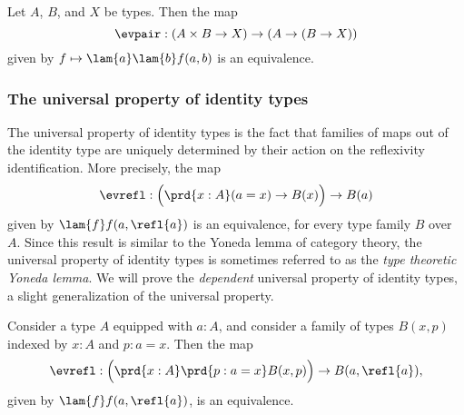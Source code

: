 \begin{cor}\label{cor:times_up_out}
Let $A$, $B$, and $X$ be types. Then the map
\begin{equation*}
\evpair: (A\times B \to X)\to (A\to (B\to X))
\end{equation*}
given by $f\mapsto\lam{a}\lam{b}f(a,b)$ is an equivalence.
\end{cor}

\subsubsection*{The universal property of identity types}
The universal property of identity types is the fact that families of maps out of the identity type are uniquely determined by their action on the reflexivity identification. More precisely, the map
\begin{equation*}
  \evrefl:\Big(\prd{x:A}(a=x)\to B(x)\Big)\to B(a)
\end{equation*}
given by $\lam{f} f(a,\refl{a})$ is an equivalence, for every type family $B$ over $A$. Since this result is similar to the Yoneda lemma of category theory, the universal property of identity types is sometimes referred to as the \emph{type theoretic Yoneda lemma}. We will prove the \emph{dependent} universal property of identity types, a slight generalization of the universal property.

\begin{thm}\label{thm:yoneda}
Consider a type $A$ equipped with $a:A$, and consider a family of types $B(x,p)$ indexed by $x:A$ and $p:a=x$. Then the map
\begin{equation*}
\evrefl:\Big(\prd{x:A}\prd{p:a=x}B(x,p)\Big)\to B(a,\refl{a}),
\end{equation*}
given by $\lam{f} f(a,\refl{a})$, is an equivalence.
\end{thm}

